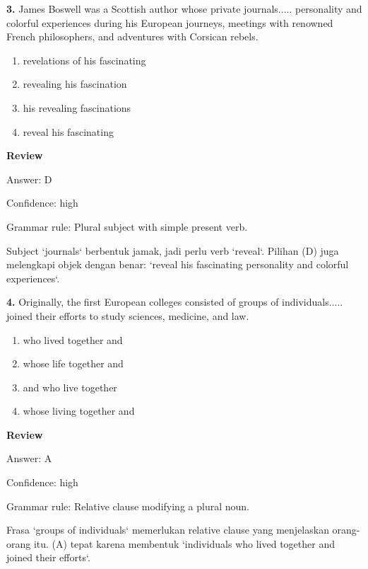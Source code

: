 \documentclass[12pt]{article}
\begin{document}
\noindent\textbf{3.} James Boswell was a Scottish author whose private journals..... personality and colorful experiences during his European journeys, meetings with renowned French philosophers, and adventures with Corsican rebels.
\begin{enumerate}[label=(\Alph*),leftmargin=*,itemsep=0.2em]
\item revelations of his fascinating
\item revealing his fascination
\item his revealing fascinations
\item reveal his fascinating
\end{enumerate}
\par
\begingroup
\setlength{\parskip}{0pt}
\setlength{\parindent}{0pt}
\textbf{Review}\par
Answer: D\par
Confidence: high\par
Grammar rule: Plural subject with simple present verb.\par
Subject `journals` berbentuk jamak, jadi perlu verb `reveal`. Pilihan (D) juga melengkapi objek dengan benar: `reveal his fascinating personality and colorful experiences`.\par
\endgroup
\par
\vspace{0.25\baselineskip}
\noindent\textbf{4.} Originally, the first European colleges consisted of groups of individuals..... joined their efforts to study sciences, medicine, and law.
\begin{enumerate}[label=(\Alph*),leftmargin=*,itemsep=0.2em]
\item who lived together and
\item whose life together and
\item and who live together
\item whose living together and
\end{enumerate}
\par
\begingroup
\setlength{\parskip}{0pt}
\setlength{\parindent}{0pt}
\textbf{Review}\par
Answer: A\par
Confidence: high\par
Grammar rule: Relative clause modifying a plural noun.\par
Frasa `groups of individuals` memerlukan relative clause yang menjelaskan orang-orang itu. (A) tepat karena membentuk `individuals who lived together and joined their efforts`.\par
\end{document}
